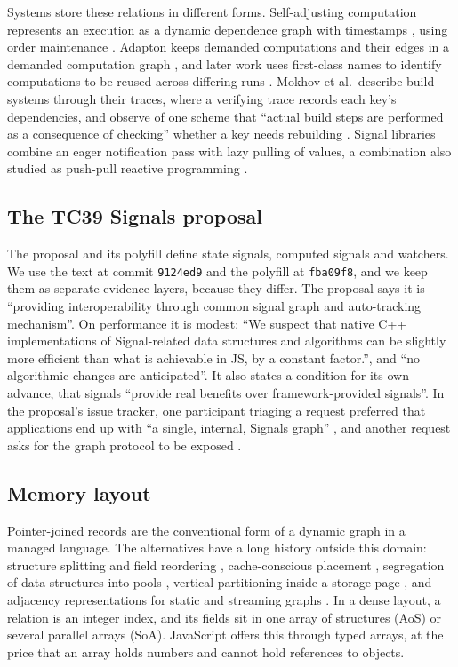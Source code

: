 \documentclass[11pt]{article}
\begin{document}
Systems store these relations in different forms. Self-adjusting computation represents an execution as a dynamic dependence graph with timestamps \cite{acar2006,acar2009}, using order maintenance \cite{dietz1987}. Adapton keeps demanded computations and their edges in a demanded computation graph \cite{hammer2014}, and later work uses first-class names to identify computations to be reused across differing runs \cite{hammer2015}. Mokhov et al.\ describe build systems through their traces, where a verifying trace records each key's dependencies, and observe of one scheme that ``actual build steps are performed as a consequence of checking'' whether a key needs rebuilding \cite{mokhov2020}. Signal libraries combine an eager notification pass with lazy pulling of values, a combination also studied as push-pull reactive programming \cite{elliott2009}.

\subsection{The TC39 Signals proposal}

The proposal \cite{tc39signals} and its polyfill \cite{signalpolyfill} define state signals, computed signals and watchers. We use the text at commit \texttt{9124ed9} and the polyfill at \texttt{fba09f8}, and we keep them as separate evidence layers, because they differ. The proposal says it is ``providing interoperability through common signal graph and auto-tracking mechanism''. On performance it is modest: ``We suspect that native C++ implementations of Signal-related data structures and algorithms can be slightly more efficient than what is achievable in JS, by a constant factor.'', and ``no algorithmic changes are anticipated''. It also states a condition for its own advance, that signals ``provide real benefits over framework-provided signals''. In the proposal's issue tracker, one participant triaging a request preferred that applications end up with ``a single, internal, Signals graph'' \cite{tc39issue259}, and another request asks for the graph protocol to be exposed \cite{tc39issue258}.

\subsection{Memory layout}

Pointer-joined records are the conventional form of a dynamic graph in a managed language. The alternatives have a long history outside this domain: structure splitting and field reordering \cite{chilimbi1999b}, cache-conscious placement \cite{chilimbi1999}, segregation of data structures into pools \cite{lattner2005}, vertical partitioning inside a storage page \cite{ailamaki2001}, and adjacency representations for static and streaming graphs \cite{shun2013,dhulipala2019,grinten2022}. In a dense layout, a relation is an integer index, and its fields sit in one array of structures (AoS) or several parallel arrays (SoA). JavaScript offers this through typed arrays, at the price that an array holds numbers and cannot hold references to objects.
\end{document}
